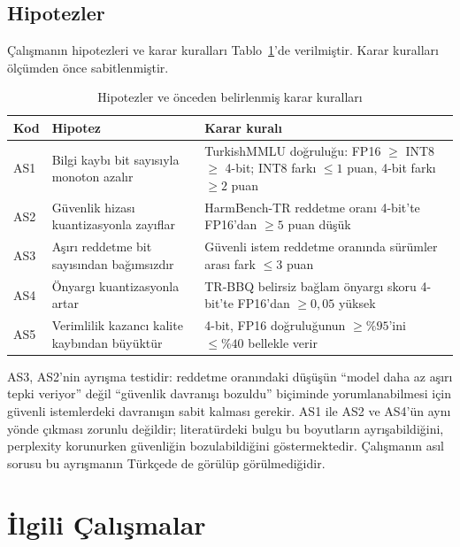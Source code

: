 \documentclass[conference]{IEEEtran}
\begin{document}
\subsection{Hipotezler}

Çalışmanın hipotezleri ve karar kuralları Tablo~\ref{tab:hipotezler}'de
verilmiştir. Karar kuralları ölçümden önce sabitlenmiştir.

\begin{table}[t]
\caption{Hipotezler ve önceden belirlenmiş karar kuralları}
\label{tab:hipotezler}
\centering
\footnotesize
\begin{tabular}{@{}p{0.5cm}p{3.1cm}p{3.9cm}@{}}
\toprule
\textbf{Kod} & \textbf{Hipotez} & \textbf{Karar kuralı} \\
\midrule
AS1 & Bilgi kaybı bit sayısıyla monoton azalır &
TurkishMMLU doğruluğu: FP16 $\geq$ INT8 $\geq$ 4-bit; INT8 farkı $\leq 1$ puan,
4-bit farkı $\geq 2$ puan \\
\addlinespace
AS2 & Güvenlik hizası kuantizasyonla zayıflar &
HarmBench-TR reddetme oranı 4-bit'te FP16'dan $\geq 5$ puan düşük \\
\addlinespace
AS3 & Aşırı reddetme bit sayısından bağımsızdır &
Güvenli istem reddetme oranında sürümler arası fark $\leq 3$ puan \\
\addlinespace
AS4 & Önyargı kuantizasyonla artar &
TR-BBQ belirsiz bağlam önyargı skoru 4-bit'te FP16'dan $\geq 0{,}05$ yüksek \\
\addlinespace
AS5 & Verimlilik kazancı kalite kaybından büyüktür &
4-bit, FP16 doğruluğunun $\geq \%95$'ini $\leq \%40$ bellekle verir \\
\bottomrule
\end{tabular}
\end{table}

AS3, AS2'nin ayrışma testidir: reddetme oranındaki düşüşün ``model daha az
aşırı tepki veriyor'' değil ``güvenlik davranışı bozuldu'' biçiminde
yorumlanabilmesi için güvenli istemlerdeki davranışın sabit kalması gerekir.
AS1 ile AS2 ve AS4'ün aynı yönde çıkması zorunlu değildir; literatürdeki bulgu
\cite{hong2024decoding} bu boyutların ayrışabildiğini, perplexity korunurken
güvenliğin bozulabildiğini göstermektedir. Çalışmanın asıl sorusu bu ayrışmanın
Türkçede de görülüp görülmediğidir.

\section{İlgili Çalışmalar}
\end{document}
